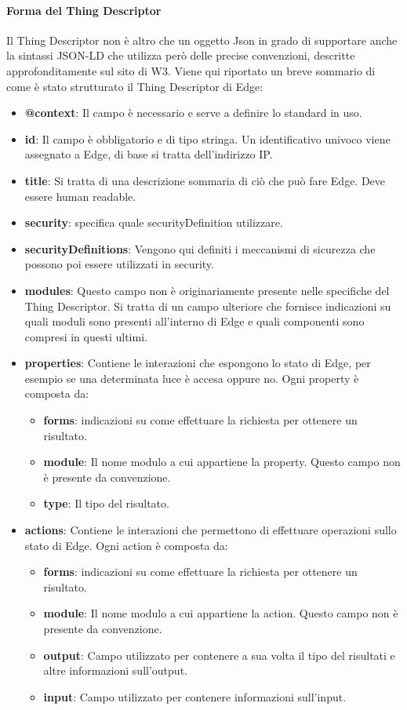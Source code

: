 \paragraph{Forma del Thing Descriptor}
\label{tdform}
Il Thing Descriptor non è altro che un oggetto Json in grado di supportare anche la sintassi JSON-LD che utilizza però delle precise convenzioni, descritte approfonditamente sul sito di W3. Viene qui riportato un breve sommario di come è stato strutturato il Thing Descriptor di Edge:
\begin{itemize}
	\item \textbf{@context}: Il campo è necessario e serve a definire lo standard in uso.
	\item \textbf{id}: Il campo è obbligatorio e di tipo stringa. Un identificativo univoco viene assegnato a Edge, di base si tratta dell’indirizzo IP.
	\item \textbf{title}: Si tratta di una descrizione sommaria di ciò che può fare Edge. Deve essere human readable.
	\item \textbf{security}: specifica quale securityDefinition utilizzare.
	\item \textbf{securityDefinitions}: Vengono qui definiti i meccanismi di sicurezza che possono poi essere utilizzati in security.
	\item \textbf{modules}: Questo campo non è originariamente presente nelle specifiche del Thing Descriptor. Si tratta di un campo ulteriore che fornisce indicazioni su quali moduli sono presenti all’interno di Edge e quali componenti sono compresi in questi ultimi.
	\item \textbf{properties}: Contiene le interazioni che espongono lo stato di Edge, per esempio se una determinata luce è accesa oppure no.
	Ogni property è composta da:
	\begin{itemize}
		\item \textbf{forms}: indicazioni su come effettuare la richiesta per ottenere un risultato.
		\item \textbf{module}: Il nome modulo a cui appartiene la property. Questo campo non è presente da convenzione.
		\item \textbf{type}: Il tipo del risultato.
	\end{itemize}
	\item \textbf{actions}: Contiene le interazioni che permettono di effettuare operazioni sullo stato di Edge. Ogni action è composta da:
	\begin{itemize}
		\item \textbf{forms}: indicazioni su come effettuare la richiesta per ottenere un risultato.
		\item \textbf{module}: Il nome modulo a cui appartiene la action. Questo campo non è presente da convenzione.
		\item \textbf{output}: Campo utilizzato per contenere a sua volta il tipo del risultati e altre informazioni sull’output.
		\item \textbf{input}: Campo utilizzato per contenere informazioni sull’input.
	\end{itemize}
\end{itemize}

